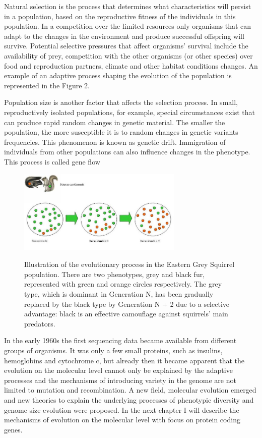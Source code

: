 \documentclass[11pt, a4paper,oneside]{report}
\begin{document}
Natural selection is the process that determines what characteristics will persist in a population, based on the reproductive fitness of the individuals in this population. In a competition over the limited resources only organisms that can adapt to the changes in the environment and produce successful offspring will survive. Potential selective pressures that affect organisms' survival include the availability of prey, competition with the other organisms (or other species) over food and reproduction partners, climate and other habitat conditions changes. An example of an adaptive process shaping the evolution of the population is represented in the Figure 2.

Population size is another factor that affects the selection process.  In small, reproductively isolated populations, for example, special circumstances exist that can produce rapid random changes in genetic material. The smaller the population, the more susceptible it is to random changes in genetic variants frequencies.  This phenomenon is known as genetic drift. Immigration of individuals from other populations can also influence changes in the phenotype. This process is called gene flow\cite{Grant1980}

\begin{figure}[t]
\begin{center}
\label{img:populations}
\includegraphics[width=0.7\textwidth]{figures/squirrel.jpg}
\end{center}
\caption{ Illustration of the evolutionary process in the Eastern Grey Squirrel population. There are two phenotypes, grey and black fur, represented with green and orange circles respectively. The grey type, which is dominant in Generation N, has been gradually replaced by the black type by Generation N + 2 due to a selective advantage: black is an effective camouflage against squirrels' main predators.} 
\end{figure}

In the early 1960s the first sequencing data became available from different groups of organisms. It was only a few small proteins, such as insulins\cite{Sanger1945}, hemoglobins\cite{INGRAM1956} and cytochrome c, but already then it became apparent that the evolution on the molecular level cannot only be explained by the adaptive processes and the mechanisms of introducing variety in the genome are not limited to mutation and recombination. A new field, molecular evolution emerged and new theories to explain the underlying processes of phenotypic diversity and genome size evolution were proposed.  In the next chapter I will describe the mechanisms of evolution on the molecular level with focus on protein coding genes. 
\end{document}
